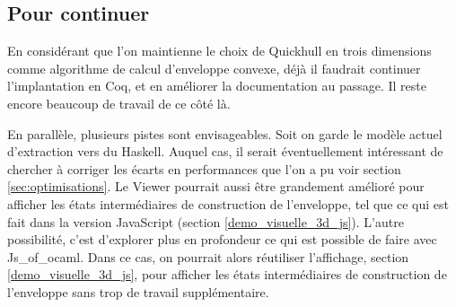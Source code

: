\documentclass[]{article}
\begin{document}
\subsection{Pour continuer}
En considérant que l'on maintienne le choix de Quickhull en trois dimensions comme algorithme de calcul d'enveloppe convexe, déjà il faudrait continuer l'implantation en Coq, et en améliorer la documentation au passage. Il reste encore beaucoup de travail de ce côté là.

En parallèle, plusieurs pistes sont envisageables. Soit on garde le modèle actuel d'extraction vers du Haskell. Auquel cas, il serait éventuellement intéressant de chercher à corriger les écarts en performances que l'on a pu voir section \ref{sec:optimisations}. Le Viewer pourrait aussi être grandement amélioré pour afficher les états intermédiaires de construction de l'enveloppe, tel que ce qui est fait dans la version JavaScript (section \ref{demo_visuelle_3d_js}). L'autre possibilité, c'est d'explorer plus en profondeur ce qui est possible de faire avec Js\_of\_ocaml. Dans ce cas, on pourrait alors réutiliser l'affichage, section \ref{demo_visuelle_3d_js}, pour afficher les états intermédiaires de construction de l'enveloppe sans trop de travail supplémentaire.

\pagebreak


\end{document}
